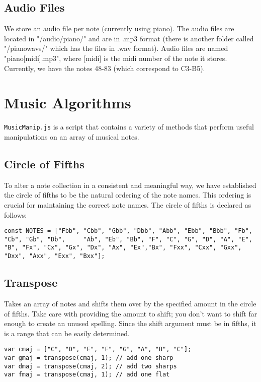 \documentclass{article}
\begin{document}
\subsection{Audio Files}
We store an audio file per note (currently using piano). The audio files are located in "/audio/piano/" and are in .mp3 format (there is another folder called "/pianowavs/" which has the files in .wav format). Audio files are named "piano[midi].mp3", where [midi] is the midi number of the note it stores. Currently, we have the notes 48-83 (which correspond to C3-B5).

\section{Music Algorithms}
\texttt{MusicManip.js} is a script that contains a variety of methods that perform useful manipulations on an array of musical notes. 
\subsection{Circle of Fifths}
To alter a note collection in a consistent and meaningful way, we have established the circle of fifths to be the natural ordering of the note names. This ordering is crucial for maintaining the correct note names. The circle of fifths is declared as follows:

\begin{lstlisting}
const NOTES = ["Fbb", "Cbb", "Gbb", "Dbb", "Abb", "Ebb", "Bbb", "Fb", "Cb", "Gb", "Db",     "Ab", "Eb", "Bb", "F", "C", "G", "D", "A", "E", "B", "Fx", "Cx", "Gx", "Dx", "Ax", "Ex","Bx", "Fxx", "Cxx", "Gxx", "Dxx", "Axx", "Exx", "Bxx"];
\end{lstlisting}

\subsection{Transpose}
 Takes an array of notes and shifts them over by the specified amount in the circle of fifths. Take care with providing the amount to shift; you don't want to shift far enough to create an unused spelling. Since the shift argument must be in fifths, it is a range that can be easily determined.
 
\begin{lstlisting}
var cmaj = ["C", "D", "E", "F", "G", "A", "B", "C"];
var gmaj = transpose(cmaj, 1); // add one sharp
var dmaj = transpose(cmaj, 2); // add two sharps
var fmaj = transpose(cmaj, 1); // add one flat
\end{lstlisting}
\end{document}
